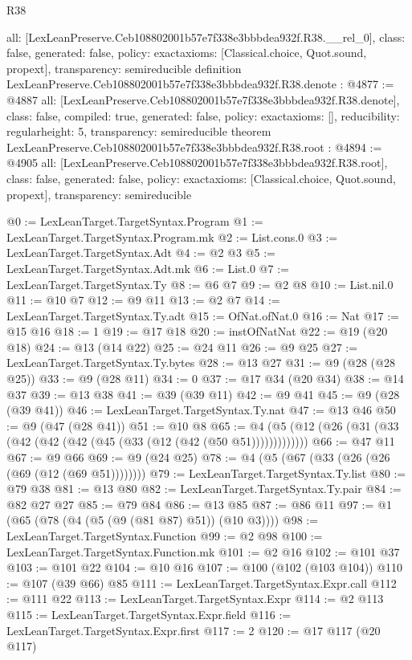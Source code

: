 \begin{lexlean}{R38}
\begin{coremodule}
{  all: [LexLeanPreserve.Ceb108802001b57e7f338e3bbbdea932f.R38.__rel_0],
  class: false,
  generated: false,
  policy: exact{axioms: [Classical.choice, Quot.sound, propext]},
  transparency: semireducible
}
definition LexLeanPreserve.Ceb108802001b57e7f338e3bbbdea932f.R38.denote : @4877 := @4887 {
  all: [LexLeanPreserve.Ceb108802001b57e7f338e3bbbdea932f.R38.denote],
  class: false,
  compiled: true,
  generated: false,
  policy: exact{axioms: []},
  reducibility: regular{height: 5},
  transparency: semireducible
}
theorem LexLeanPreserve.Ceb108802001b57e7f338e3bbbdea932f.R38.root : @4894 := @4905 {
  all: [LexLeanPreserve.Ceb108802001b57e7f338e3bbbdea932f.R38.root],
  class: false,
  generated: false,
  policy: exact{axioms: [Classical.choice, Quot.sound, propext]},
  transparency: semireducible
}

@0 := LexLeanTarget.TargetSyntax.Program
@1 := LexLeanTarget.TargetSyntax.Program.mk
@2 := List.cons.{0}
@3 := LexLeanTarget.TargetSyntax.Adt
@4 := @2 @3
@5 := LexLeanTarget.TargetSyntax.Adt.mk
@6 := List.{0}
@7 := LexLeanTarget.TargetSyntax.Ty
@8 := @6 @7
@9 := @2 @8
@10 := List.nil.{0}
@11 := @10 @7
@12 := @9 @11
@13 := @2 @7
@14 := LexLeanTarget.TargetSyntax.Ty.adt
@15 := OfNat.ofNat.{0}
@16 := Nat
@17 := @15 @16
@18 := 1
@19 := @17 @18
@20 := instOfNatNat
@22 := @19 (@20 @18)
@24 := @13 (@14 @22)
@25 := @24 @11
@26 := @9 @25
@27 := LexLeanTarget.TargetSyntax.Ty.bytes
@28 := @13 @27
@31 := @9 (@28 (@28 @25))
@33 := @9 (@28 @11)
@34 := 0
@37 := @17 @34 (@20 @34)
@38 := @14 @37
@39 := @13 @38
@41 := @39 (@39 @11)
@42 := @9 @41
@45 := @9 (@28 (@39 @41))
@46 := LexLeanTarget.TargetSyntax.Ty.nat
@47 := @13 @46
@50 := @9 (@47 (@28 @41))
@51 := @10 @8
@65 := @4 (@5 (@12 (@26 (@31 (@33 (@42 (@42 (@42 (@45 (@33 (@12 (@42 (@50 @51)))))))))))))
@66 := @47 @11
@67 := @9 @66
@69 := @9 (@24 @25)
@78 := @4 (@5 (@67 (@33 (@26 (@26 (@69 (@12 (@69 @51))))))))
@79 := LexLeanTarget.TargetSyntax.Ty.list
@80 := @79 @38
@81 := @13 @80
@82 := LexLeanTarget.TargetSyntax.Ty.pair
@84 := @82 @27 @27
@85 := @79 @84
@86 := @13 @85
@87 := @86 @11
@97 := @1 (@65 (@78 (@4 (@5 (@9 (@81 @87) @51)) (@10 @3))))
@98 := LexLeanTarget.TargetSyntax.Function
@99 := @2 @98
@100 := LexLeanTarget.TargetSyntax.Function.mk
@101 := @2 @16
@102 := @101 @37
@103 := @101 @22
@104 := @10 @16
@107 := @100 (@102 (@103 @104))
@110 := @107 (@39 @66) @85
@111 := LexLeanTarget.TargetSyntax.Expr.call
@112 := @111 @22
@113 := LexLeanTarget.TargetSyntax.Expr
@114 := @2 @113
@115 := LexLeanTarget.TargetSyntax.Expr.field
@116 := LexLeanTarget.TargetSyntax.Expr.first
@117 := 2
@120 := @17 @117 (@20 @117)

\end{coremodule}
\end{lexlean}
